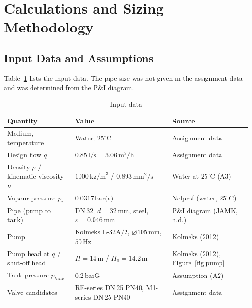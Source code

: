 \documentclass[12pt,a4paper]{article}
\begin{document}
\section{Calculations and Sizing Methodology}

\subsection{Input Data and Assumptions}
Table~\ref{tab:input} lists the input data. The pipe size was not given in the assignment data and was determined from the P\&I diagram.

\begin{table}[H]
\centering
\caption{Input data}
\label{tab:input}
\small
\begin{tabularx}{\textwidth}{@{}lXl@{}}
\toprule
Quantity & Value & Source \\
\midrule
Medium, temperature & Water, $25^\circ\text{C}$ & Assignment data \\
Design flow $q$ & $0.85\,\text{l/s} = 3.06\,\text{m}^3/\text{h}$ & Assignment data \\
Density $\rho$ / kinematic viscosity $\nu$ & $1000\,\text{kg/m}^3$ / $0.893\,\text{mm}^2/\text{s}$ & Water at $25^\circ\text{C}$ (A3) \\
Vapour pressure $p_v$ & $0.0317\,\text{bar(a)}$ & Nelprof (water, $25^\circ\text{C}$) \\
Pipe (pump to tank) & DN\,32, $d = 32\,\text{mm}$, steel, $\varepsilon = 0.046\,\text{mm}$ & P\&I diagram (JAMK, n.d.) \\
Pump & Kolmeks L-32A/2, $\varnothing 105\,\text{mm}$, $50\,\text{Hz}$ & Kolmeks (2012) \\
Pump head at $q$ / shut-off head & $H = 14\,\text{m}$ / $H_0 = 14.2\,\text{m}$ & Kolmeks (2012), Figure~\ref{fig:pump} \\
Tank pressure $p_{tank}$ & $0.2\,\text{barG}$ & Assumption (A2) \\
Valve candidates & RE-series DN\,25 PN40, M1-series DN\,25 PN40 & Assignment data \\
\bottomrule
\end{tabularx}
\end{table}
\end{document}
